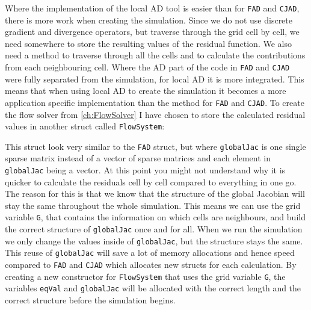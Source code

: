 Where the implementation of the local AD tool is easier than for \texttt{FAD} and \texttt{CJAD}, there is more work when creating the simulation. Since we do not use discrete gradient and divergence operators, but traverse through the grid cell by cell, we need somewhere to store the resulting values of the residual function. We also need a method to traverse through all the cells and to calculate the contributions from each neighbouring cell. Where the AD part of the code in \texttt{FAD} and \texttt{CJAD} were fully separated from the simulation, for local AD it is more integrated. This means that when using local AD to create the simulation it becomes a more application specific implementation than the method for \texttt{FAD} and \texttt{CJAD}. To create the flow solver from \autoref{ch:FlowSolver} I have chosen to store the calculated residual values in another struct called \texttt{FlowSystem}:

This struct look very similar to the \texttt{FAD} struct, but where \texttt{globalJac} is one single sparse matrix instead of a vector of sparse matrices and each element in \texttt{globalJac} being a vector. At this point you might not understand why it is quicker to calculate the residuals cell by cell compared to everything in one go. The reason for this is that we know that the structure of the global Jacobian will stay the same throughout the whole simulation. This means we can use the grid variable \texttt{G}, that contains the information on which cells are neighbours, and build the correct structure of \texttt{globalJac} once and for all. When we run the simulation we only change the values inside of \texttt{globalJac}, but the structure stays the same. This reuse of \texttt{globalJac} will save a lot of memory allocations and hence speed compared to \texttt{FAD} and \texttt{CJAD} which allocates new structs for each calculation. By creating a new constructor for \texttt{FlowSystem} that uses the grid variable \texttt{G}, the variables \texttt{eqVal} and \texttt{globalJac} will be allocated with the correct length and the correct structure before the simulation begins.

